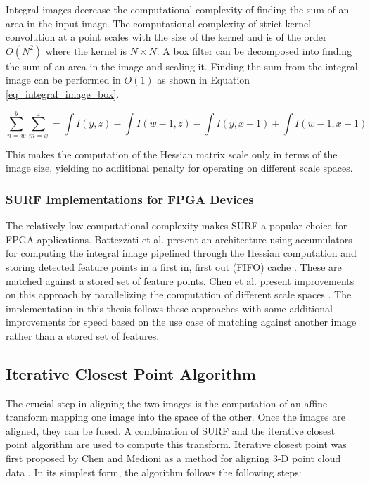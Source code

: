 \documentclass{article}
\begin{document}
Integral images decrease the computational complexity of finding the sum of an area in the input image. The computational complexity of strict kernel convolution at a point scales with the size of the kernel and is of the order $O(N^2)$ where the kernel is $N \times N$. A box filter can be decomposed into finding the sum of an area in the image and scaling it. Finding the sum from the integral image can be performed in $O(1)$ as shown in Equation \ref{eq_integral_image_box}. 

\begin{equation}
\sum\limits_{n=w}^y \sum\limits_{m=x}^z = \int I(y,z) - \int I(w-1,z) - \int I(y,x-1) + \int I(w-1, x-1)
\label{eq_integral_image_box}
\end{equation}

This makes the computation of the Hessian matrix scale only in terms of the image size, yielding no additional penalty for operating on different scale spaces.

\subsubsection{SURF Implementations for FPGA Devices}

The relatively low computational complexity makes SURF a popular choice for FPGA applications. Battezzati et al. present an architecture using accumulators for computing the integral image pipelined through the Hessian computation and storing detected feature points in a first in, first out (FIFO) cache \cite{battezzati_surf_2012}. These are matched against a stored set of feature points. Chen et al. present improvements on this approach by parallelizing the computation of different scale spaces \cite{chen_fpga-based_2016}. The implementation in this thesis follows these approaches with some additional improvements for speed based on the use case of matching against another image rather than a stored set of features.

\subsection{Iterative Closest Point Algorithm}

The crucial step in aligning the two images is the computation of an affine transform mapping one image into the space of the other. Once the images are aligned, they can be fused. A combination of SURF and the iterative closest point algorithm are used to compute this transform. Iterative closest point was first proposed by Chen and Medioni as a method for aligning 3-D point cloud data \cite{chen_object_1992}. In its simplest form, the algorithm follows the following steps:
\end{document}
